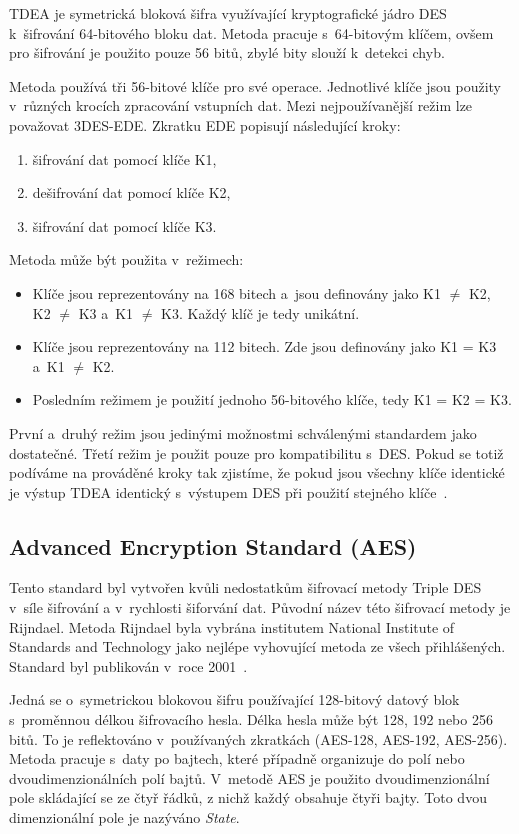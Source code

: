 TDEA je symetrická bloková šifra využívající kryptografické jádro DES k~šifrování 64-bitového bloku
dat. Metoda pracuje s~64-bitovým klíčem, ovšem pro šifrování je použito pouze 56 bitů, zbylé bity
slouží k~detekci chyb. 

Metoda používá tři 56-bitové klíče pro své operace. Jednotlivé klíče jsou použity v~různých krocích
zpracování vstupních dat. Mezi nejpoužívanější režim lze považovat 3DES-EDE. Zkratku EDE popisují
následující kroky:
\begin{enumerate}
    \item šifrování dat pomocí klíče K1,
    \item dešifrování dat pomocí klíče K2,
    \item šifrování dat pomocí klíče K3.
\end{enumerate}
Metoda může být použita v~režimech:
\begin{itemize}
    \item Klíče jsou reprezentovány na 168 bitech a~jsou definovány jako K1 $\neq$ K2, K2 $\neq$ K3
        a~K1 $\neq$ K3. Každý klíč je tedy unikátní.
    \item Klíče jsou reprezentovány na 112 bitech. Zde jsou definovány jako K1 = K3 a~K1 $\neq$ K2.
    \item Posledním režimem je použití jednoho 56-bitového klíče, tedy K1 = K2 = K3.
\end{itemize}
První a~druhý režim jsou jedinými možnostmi schválenými standardem jako dostatečné. Třetí režim
je použit pouze pro kompatibilitu s~DES. Pokud se totiž podíváme na prováděné kroky tak zjistíme,
že pokud jsou všechny klíče identické je výstup TDEA identický s~výstupem DES při použití stejného
klíče~\cite{NIST:2012}.

\subsection{Advanced Encryption Standard (AES)}
Tento standard byl vytvořen kvůli nedostatkům šifrovací metody Triple DES v~síle šifrování a
v~rychlosti šiforvání dat. Původní název této šifrovací metody je Rijndael. Metoda Rijndael byla
vybrána institutem National Institute of Standards and Technology jako nejlépe vyhovující metoda ze
všech přihlášených. Standard byl publikován v~roce 2001~\cite{NIST:2001}.

Jedná se o~symetrickou blokovou šifru používající 128-bitový datový blok s~proměnnou délkou
šifrovacího hesla. Délka hesla může být 128, 192 nebo 256 bitů. To je reflektováno v~používaných
zkratkách (AES-128, AES-192, AES-256). Metoda pracuje s~daty po bajtech, které případně organizuje
do polí nebo dvoudimenzionálních polí bajtů. V~metodě AES je použito dvoudimenzionální pole
skládající se ze čtyř řádků, z nichž každý obsahuje čtyři bajty. Toto dvou dimenzionální pole je
nazýváno {\it State}.

